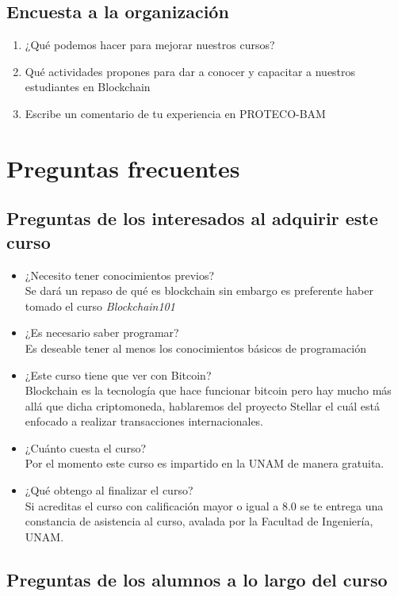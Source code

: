 \documentclass[a4paper,12pt]{/home/armando/Documentos/Cursos/LaTeX/Plantillas/lib/pub}
\begin{document}
	\subsection{Encuesta a la organización}
	\begin{enumerate}
		\item ¿Qué podemos hacer para mejorar nuestros cursos?
		\item Qué actividades propones para dar a conocer y capacitar a nuestros estudiantes en Blockchain
		\item Escribe un comentario de tu experiencia en PROTECO-BAM
	\end{enumerate}

\section{Preguntas frecuentes}
	\subsection{Preguntas de los interesados al adquirir este curso}
	\begin{itemize}
		\item ¿Necesito tener conocimientos previos?\\Se dará un repaso de qué es blockchain sin embargo es preferente haber tomado el curso \textit{Blockchain101}
		\item ¿Es necesario saber programar?\\Es deseable tener al menos los conocimientos básicos de programación 
		\item ¿Este curso tiene que ver con Bitcoin?\\Blockchain es la tecnología que hace funcionar bitcoin pero hay mucho más allá que dicha criptomoneda, hablaremos del proyecto Stellar el cuál está enfocado a realizar transacciones internacionales.
		\item ¿Cuánto cuesta el curso?\\Por el momento este curso es impartido en la UNAM de manera gratuita.
		\item ¿Qué obtengo al finalizar el curso?\\Si acreditas el curso con calificación mayor o igual a 8.0 se te entrega una constancia de asistencia al curso, avalada por la Facultad de Ingeniería, UNAM.
	\end{itemize}
	\subsection{Preguntas de los alumnos a lo largo del curso}
\end{document}
